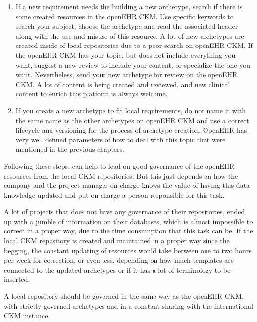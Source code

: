 \documentclass[mim_thesis.tex]{subfiles}
\begin{document}
\begin{enumerate}
\item If a new requirement needs the building a new archetype, search if there is some created resources in the openEHR CKM. Use specific keywords to search your subject, choose the archetype and read the associated header along with the use and misuse of this resource. A lot of new archetypes are created inside of local repositories due to a poor search on openEHR CKM. If the openEHR CKM has your topic, but does not include everything you want, suggest a new review to include your content, or specialize the one you want. Nevertheless, send your new archetype for review on the openEHR CKM. A lot of content is being created and reviewed, and new clinical content to enrich this platform is always welcome. 
\item If you create a new archetype to fit local requirements, do not name it with the same name as the other archetypes on openEHR CKM and use a correct lifecycle and versioning for the process of archetype creation. OpenEHR has very well defined parameters of how to deal with this topic that were mentioned in the previous chapters.

\end{enumerate}

Following these steps, can help to lead on good governance of the openEHR resources from the local CKM repositories. But this just depends on how the company and the project manager on charge knows the value of having this data knowledge updated and put on charge a person responsible for this task. 

A lot of projects that does not have any governance of their repositories, ended up with a jumble of information on their databases, which is almost impossible to correct in a proper way, due to the time consumption that this task can be. If the local CKM repository is created and maintained in a proper way since the begging, the constant updating of resources would take between one to two hours per week for correction, or even less, depending on how much templates are connected to the updated archetypes or if it has a lot of terminology to be inserted. 

A local repository should be governed in the same way as the openEHR CKM, with strictly governed archetypes and in a constant sharing with the international CKM instance. 
\end{document}

